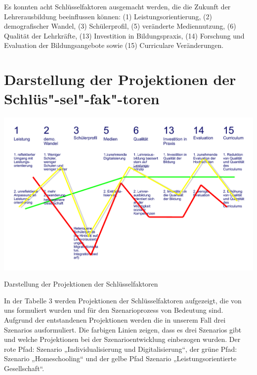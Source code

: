\documentclass[12pt,a4paper]{article}
\begin{document}
Es konnten acht Schlüsselfaktoren ausgemacht werden, die die Zukunft der Lehrerausbildung beeinflussen können: (1) Leistungsorientierung, (2) demografischer Wandel, (3) Schülerprofil, (5) veränderte Mediennutzung, (6) Qualität der Lehrkräfte, (13) Investition in Bildungspraxis, (14) Forschung und Evaluation der Bildungsangebote sowie (15) Curriculare Veränderungen.

\pagebreak

\section{Darstellung der Projektionen der Schlüs"-sel"-fak"-toren} 
\begin{table}[!ht]
\begin{center}
\includegraphics[scale=0.67,angle=90]{projektionen.pdf}
\caption{Darstellung der Projektionen der Schlüsselfaktoren}
\end{center}
\label{projektionen}
\end{table}
\FloatBarrier

In der Tabelle 3 werden Projektionen der Schlüsselfaktoren aufgezeigt, die von uns formuliert wurden und für den Szenarioprozess von Bedeutung sind. Aufgrund der entstandenen Projektionen werden die in unserem Fall drei Szenarios ausformuliert. Die farbigen Linien zeigen, dass es drei Szenarios gibt und welche Projektionen bei der Szenarioentwicklung einbezogen wurden. Der rote Pfad: Szenario „Individualisierung und Digitalisierung“, der grüne Pfad: Szenario „Homeschooling“ und der gelbe Pfad Szenario „Leistungsorientierte Gesellschaft“.
\end{document}
